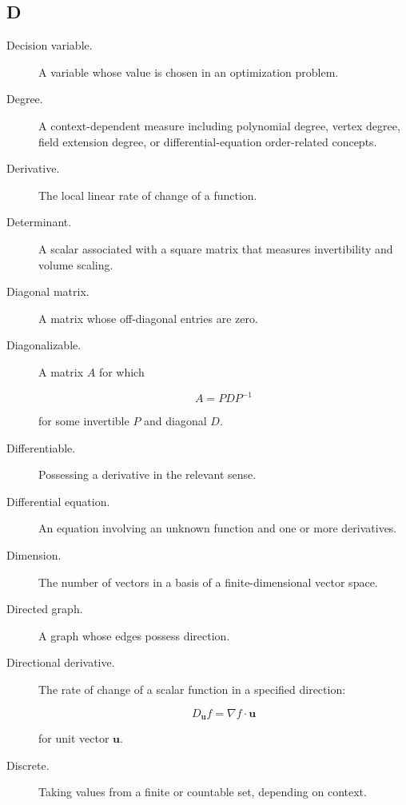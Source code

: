\subsection*{D}

\begin{description}

\item[Decision variable.]
A variable whose value is chosen in an optimization problem.

\item[Degree.]
A context-dependent measure including polynomial degree, vertex degree, field
extension degree, or differential-equation order-related concepts.

\item[Derivative.]
The local linear rate of change of a function.

\item[Determinant.]
A scalar associated with a square matrix that measures invertibility and
volume scaling.

\item[Diagonal matrix.]
A matrix whose off-diagonal entries are zero.

\item[Diagonalizable.]
A matrix \(A\) for which

\[
A=PDP^{-1}
\]

for some invertible \(P\) and diagonal \(D\).

\item[Differentiable.]
Possessing a derivative in the relevant sense.

\item[Differential equation.]
An equation involving an unknown function and one or more derivatives.

\item[Dimension.]
The number of vectors in a basis of a finite-dimensional vector space.

\item[Directed graph.]
A graph whose edges possess direction.

\item[Directional derivative.]
The rate of change of a scalar function in a specified direction:

\[
D_{\mathbf{u}}f
=
\nabla f\cdot\mathbf{u}
\]

for unit vector \(\mathbf{u}\).

\item[Discrete.]
Taking values from a finite or countable set, depending on context.


\end{description}
